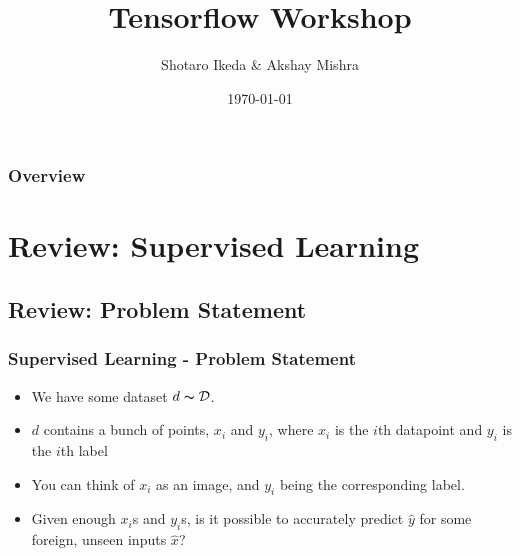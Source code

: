 \documentclass{beamer}
\title[Tensorflow Workshop]{Tensorflow Workshop} %
\author{Shotaro Ikeda \& Akshay Mishra} %
\institute[SIGAI] %
{
  \textit{http://sigai.ml} %
}
\date{\today} %
\begin{document}
\begin{frame}
  \titlepage %
\end{frame}

\begin{frame}
  \frametitle{Overview} %
  \tableofcontents %
\end{frame}


\section{Review: Supervised Learning} %

\subsection{Review: Problem Statement}
\begin{frame}
  \frametitle{Supervised Learning - Problem Statement}
  \begin{itemize}
  \item We have some dataset $d \thicksim \mathcal{D}$.
  \item $d$ contains a bunch of points, $x_i$ and $y_i$, where $x_i$ is the $i$th datapoint and $y_i$ is the $i$th label
  \item You can think of $x_i$ as an image, and $y_i$ being the corresponding label.
  \item Given enough $x_i$s and $y_i$s, is it possible to accurately predict $\hat{y}$ for some foreign, unseen inputs $\hat{x}$?
  \end{itemize}
\end{frame}
\end{document}
